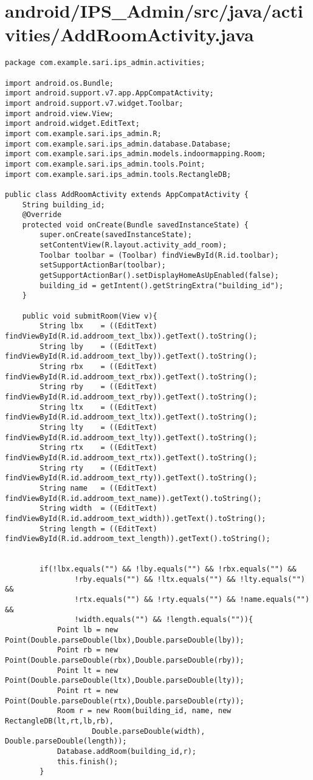 \section{android/IPS\_Admin/src/java/activities/AddRoomActivity.java}
\begin{lstlisting}package com.example.sari.ips_admin.activities;

import android.os.Bundle;
import android.support.v7.app.AppCompatActivity;
import android.support.v7.widget.Toolbar;
import android.view.View;
import android.widget.EditText;
import com.example.sari.ips_admin.R;
import com.example.sari.ips_admin.database.Database;
import com.example.sari.ips_admin.models.indoormapping.Room;
import com.example.sari.ips_admin.tools.Point;
import com.example.sari.ips_admin.tools.RectangleDB;

public class AddRoomActivity extends AppCompatActivity {
    String building_id;
    @Override
    protected void onCreate(Bundle savedInstanceState) {
        super.onCreate(savedInstanceState);
        setContentView(R.layout.activity_add_room);
        Toolbar toolbar = (Toolbar) findViewById(R.id.toolbar);
        setSupportActionBar(toolbar);
        getSupportActionBar().setDisplayHomeAsUpEnabled(false);
        building_id = getIntent().getStringExtra("building_id");
    }

    public void submitRoom(View v){
        String lbx    = ((EditText) findViewById(R.id.addroom_text_lbx)).getText().toString();
        String lby    = ((EditText) findViewById(R.id.addroom_text_lby)).getText().toString();
        String rbx    = ((EditText) findViewById(R.id.addroom_text_rbx)).getText().toString();
        String rby    = ((EditText) findViewById(R.id.addroom_text_rby)).getText().toString();
        String ltx    = ((EditText) findViewById(R.id.addroom_text_ltx)).getText().toString();
        String lty    = ((EditText) findViewById(R.id.addroom_text_lty)).getText().toString();
        String rtx    = ((EditText) findViewById(R.id.addroom_text_rtx)).getText().toString();
        String rty    = ((EditText) findViewById(R.id.addroom_text_rty)).getText().toString();
        String name   = ((EditText) findViewById(R.id.addroom_text_name)).getText().toString();
        String width  = ((EditText) findViewById(R.id.addroom_text_width)).getText().toString();
        String length = ((EditText) findViewById(R.id.addroom_text_length)).getText().toString();


        if(!lbx.equals("") && !lby.equals("") && !rbx.equals("") &&
                !rby.equals("") && !ltx.equals("") && !lty.equals("") &&
                !rtx.equals("") && !rty.equals("") && !name.equals("") &&
                !width.equals("") && !length.equals("")){
            Point lb = new Point(Double.parseDouble(lbx),Double.parseDouble(lby));
            Point rb = new Point(Double.parseDouble(rbx),Double.parseDouble(rby));
            Point lt = new Point(Double.parseDouble(ltx),Double.parseDouble(lty));
            Point rt = new Point(Double.parseDouble(rtx),Double.parseDouble(rty));
            Room r = new Room(building_id, name, new RectangleDB(lt,rt,lb,rb),
                    Double.parseDouble(width), Double.parseDouble(length));
            Database.addRoom(building_id,r);
            this.finish();
        }


\end{lstlisting}
